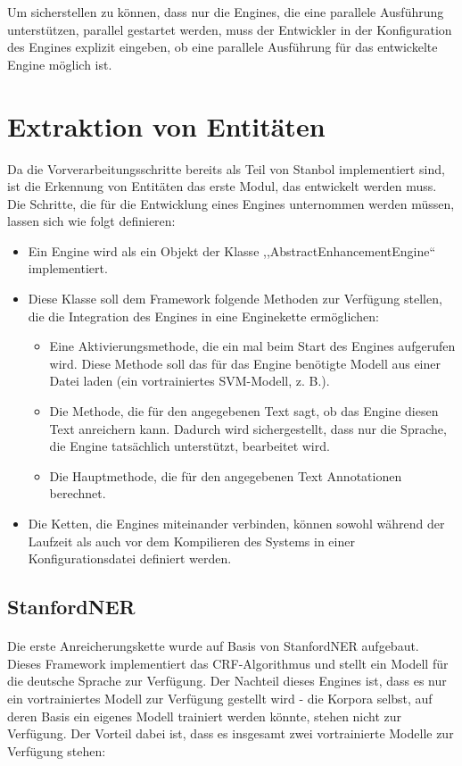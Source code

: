 Um sicherstellen zu können, dass nur die Engines, die eine parallele Ausführung unterstützen, parallel gestartet werden, muss der Entwickler in der Konfiguration des Engines explizit eingeben, ob eine parallele Ausführung für das entwickelte Engine möglich ist.

\section{Extraktion von Entitäten} \label{sec:extraktimpl}
Da die Vorverarbeitungsschritte bereits als Teil von Stanbol implementiert sind, ist die Erkennung von Entitäten das erste Modul, das entwickelt werden muss. Die Schritte, die für die Entwicklung eines Engines unternommen werden müssen, lassen sich wie folgt definieren:
\begin{itemize}
\item Ein Engine wird als ein Objekt der Klasse ,,AbstractEnhancementEngine`` implementiert. 
\item Diese Klasse soll dem Framework folgende Methoden zur Verfügung stellen, die die Integration des Engines in eine Enginekette ermöglichen:
\begin{itemize}
\item Eine Aktivierungsmethode, die ein mal beim Start des Engines aufgerufen wird. Diese Methode soll das für das Engine benötigte Modell aus einer Datei laden (ein vortrainiertes SVM-Modell, z. B.).
\item Die Methode, die für den angegebenen Text sagt, ob das Engine diesen Text anreichern kann. Dadurch wird sichergestellt, dass nur die Sprache, die Engine tatsächlich unterstützt, bearbeitet wird.
\item Die Hauptmethode, die für den angegebenen Text Annotationen berechnet.
\end{itemize}
\item Die Ketten, die Engines miteinander verbinden, können sowohl während der Laufzeit als auch vor dem Kompilieren des Systems in einer Konfigurationsdatei definiert werden.
\end{itemize}

\subsection{StanfordNER} \label{subsec:stanfordner}
\paragraph{}
Die erste Anreicherungskette wurde auf Basis von StanfordNER\cite{Jenny/etal:07} aufgebaut. Dieses Framework implementiert das CRF-Algorithmus und stellt ein Modell für die deutsche Sprache zur Verfügung\cite{faruqui10:_training}. Der Nachteil dieses Engines ist, dass es nur ein vortrainiertes Modell zur Verfügung gestellt wird - die Korpora selbst, auf deren Basis ein eigenes Modell trainiert werden könnte, stehen nicht zur Verfügung. Der Vorteil dabei ist, dass es insgesamt zwei vortrainierte Modelle zur Verfügung stehen:

